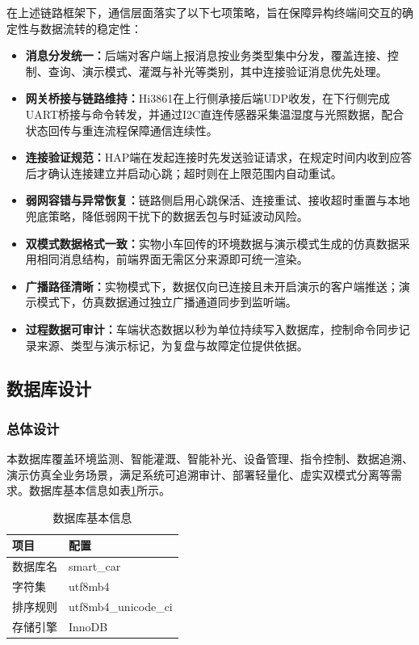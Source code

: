 \documentclass{article}
\begin{document}
在上述链路框架下，通信层面落实了以下七项策略，旨在保障异构终端间交互的确定性与数据流转的稳定性：
\begin{itemize}[leftmargin=2em,itemsep=0.2em,topsep=0.2em]
  \item \textbf{消息分发统一：}后端对客户端上报消息按业务类型集中分发，覆盖连接、控制、查询、演示模式、灌溉与补光等类别，其中连接验证消息优先处理。
  \item \textbf{网关桥接与链路维持：}Hi3861在上行侧承接后端UDP收发，在下行侧完成UART桥接与命令转发，并通过I2C直连传感器采集温湿度与光照数据，配合状态回传与重连流程保障通信连续性。
  \item \textbf{连接验证规范：}HAP端在发起连接时先发送验证请求，在规定时间内收到应答后才确认连接建立并启动心跳；超时则在上限范围内自动重试。
  \item \textbf{弱网容错与异常恢复：}链路侧启用心跳保活、连接重试、接收超时重置与本地兜底策略，降低弱网干扰下的数据丢包与时延波动风险。
  \item \textbf{双模式数据格式一致：}实物小车回传的环境数据与演示模式生成的仿真数据采用相同消息结构，前端界面无需区分来源即可统一渲染。
  \item \textbf{广播路径清晰：}实物模式下，数据仅向已连接且未开启演示的客户端推送；演示模式下，仿真数据通过独立广播通道同步到监听端。
  \item \textbf{过程数据可审计：}车端状态数据以秒为单位持续写入数据库，控制命令同步记录来源、类型与演示标记，为复盘与故障定位提供依据。
\end{itemize}

\subsection{数据库设计}

\subsubsection{总体设计}

本数据库覆盖环境监测、智能灌溉、智能补光、设备管理、指令控制、数据追溯、演示仿真全业务场景，满足系统可追溯审计、部署轻量化、虚实双模式分离等需求。数据库基本信息如表\ref{tab:数据库基本信息}所示。

\begin{table}[htbp]
  \centering
  \caption{数据库基本信息}
  \label{tab:数据库基本信息}
  \begin{tabular}{|l|l|}
    \hline
    项目     & 配置                  \\
    \hline
    数据库名 & smart\_car            \\
    字符集   & utf8mb4               \\
    排序规则 & utf8mb4\_unicode\_ci  \\
    存储引擎 & InnoDB                \\
    \hline
  \end{tabular}
\end{table}
\end{document}
